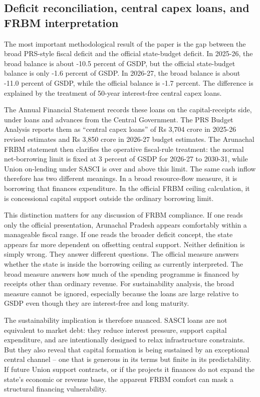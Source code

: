 \documentclass[11pt,a4paper]{article}
\begin{document}
\subsection{Deficit reconciliation, central capex loans, and FRBM interpretation}

The most important methodological result of the paper is the gap between the broad PRS-style fiscal deficit and the official state-budget deficit. In 2025-26, the broad balance is about -10.5 percent of GSDP, but the official state-budget balance is only -1.6 percent of GSDP. In 2026-27, the broad balance is about -11.0 percent of GSDP, while the official balance is -1.7 percent. The difference is explained by the treatment of 50-year interest-free central capex loans.

The Annual Financial Statement records these loans on the capital-receipts side, under loans and advances from the Central Government. The PRS Budget Analysis reports them as ``central capex loans'' of Rs 3,704 crore in 2025-26 revised estimates and Rs 3,850 crore in 2026-27 budget estimates. The Arunachal FRBM statement then clarifies the operative fiscal-rule treatment: the normal net-borrowing limit is fixed at 3 percent of GSDP for 2026-27 to 2030-31, while Union on-lending under SASCI is over and above this limit. The same cash inflow therefore has two different meanings. In a broad resource-flow measure, it is borrowing that finances expenditure. In the official FRBM ceiling calculation, it is concessional capital support outside the ordinary borrowing limit.

This distinction matters for any discussion of FRBM compliance. If one reads only the official presentation, Arunachal Pradesh appears comfortably within a manageable fiscal range. If one reads the broader deficit concept, the state appears far more dependent on offsetting central support. Neither definition is simply wrong. They answer different questions. The official measure answers whether the state is inside the borrowing ceiling as currently interpreted. The broad measure answers how much of the spending programme is financed by receipts other than ordinary revenue. For sustainability analysis, the broad measure cannot be ignored, especially because the loans are large relative to GSDP even though they are interest-free and long maturity.

The sustainability implication is therefore nuanced. SASCI loans are not equivalent to market debt: they reduce interest pressure, support capital expenditure, and are intentionally designed to relax infrastructure constraints. But they also reveal that capital formation is being sustained by an exceptional central channel -- one that is generous in its terms but finite in its predictability. If future Union support contracts, or if the projects it finances do not expand the state's economic or revenue base, the apparent FRBM comfort can mask a structural financing vulnerability.
\end{document}
